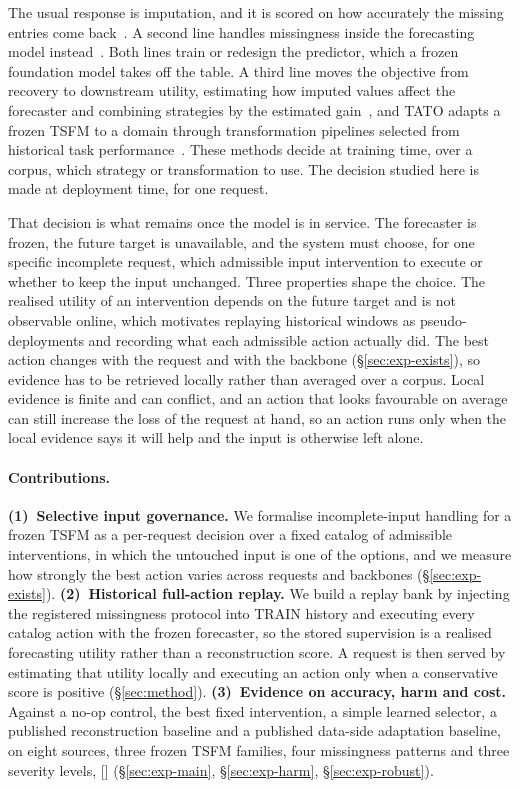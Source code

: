 \documentclass{article}
\newcommand{\ph}[1]{\textcolor{phgray}{\textsf{[\detokenize{#1}]}}}
\newcommand{\tsfm}{TSFM}
\begin{document}
The usual response is imputation, and it is scored on how accurately the missing entries come
back~\citep{cao2018brits,tashiro2021csdi,du2023saits}. A second line handles missingness inside
the forecasting model instead~\citep{chen2024bitgraph,peng2025s4m}. Both lines train or
redesign the predictor, which a frozen foundation model takes off the table. A third
line moves the objective from recovery to downstream utility, estimating how imputed values
affect the forecaster and combining strategies by the estimated
gain~\citep{wang2024taskoriented,hao2025toivsf,xu2026srdi}, and TATO adapts a frozen \tsfm{} to
a domain through transformation pipelines selected from historical task
performance~\citep{qiu2026tato}. These methods decide at training time, over a corpus, which
strategy or transformation to use. The decision studied here is made at deployment time, for
one request.

That decision is what remains once the model is in service. The forecaster is frozen, the
future target is unavailable, and the system must choose, for one specific incomplete request,
which admissible input intervention to execute or whether to keep the input unchanged. Three
properties shape the choice. The realised utility of an intervention depends on the future
target and is not observable online, which motivates replaying historical windows as
pseudo-deployments and recording what each admissible action actually did. The best action
changes with the request and with the backbone (\S\ref{sec:exp-exists}), so evidence has to be
retrieved locally rather than averaged over a corpus. Local evidence is finite and can
conflict, and an action that looks favourable on average can still increase the loss of the
request at hand, so an action runs only when the local evidence says it will help and the
input is otherwise left alone.

\paragraph{Contributions.}
\textbf{(1)~Selective input governance.} We formalise incomplete-input handling for a frozen
\tsfm{} as a per-request decision over a fixed catalog of admissible interventions, in which
the untouched input is one of the options, and we measure how strongly the best action varies
across requests and backbones (\S\ref{sec:exp-exists}). \textbf{(2)~Historical full-action
replay.} We build a replay bank by injecting the registered missingness protocol into TRAIN
history and executing every catalog action with the frozen forecaster, so the stored
supervision is a realised forecasting utility rather than a reconstruction score. A request is
then served by estimating that utility locally and executing an action only when a
conservative score is positive (\S\ref{sec:method}). \textbf{(3)~Evidence on accuracy, harm
and cost.} Against a no-op control, the best fixed intervention, a simple learned selector, a
published reconstruction baseline and a published data-side adaptation baseline, on eight
sources, three frozen \tsfm{} families, four missingness patterns and three severity levels,
\ph{CONTRIB_RESULT} (\S\ref{sec:exp-main}, \S\ref{sec:exp-harm}, \S\ref{sec:exp-robust}).
\end{document}
